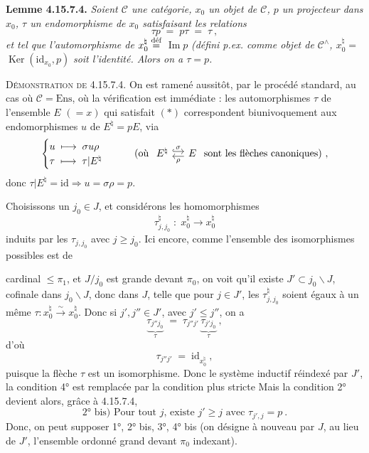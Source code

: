 \documentclass[11pt]{article}
\newcommand{\printedpage}[1]{\marginpar{\footnotesize p.~#1}}
\newcommand{\msp}[1]{\marginpar{\footnotesize [#1]}}
\newcommand{\cC}{\mathcal{C}}
\newcommand{\id}{\mathrm{id}}
\newcommand{\defeq}{\overset{\text{\upshape déf}}{=}}
\newcommand{\Img}{\operatorname{Im}}
\newcommand{\Ker}{\operatorname{Ker}}
\begin{document}
\textbf{Lemme 4.15.7.4.} \textit{Soient $\cC$ une catégorie, $x_0$ un objet de $\cC$, $p$ un projecteur dans $x_0$, $\tau$ un endomorphisme de $x_0$ satisfaisant les relations}
\[
\tau p \;=\; p\tau \;=\; \tau\ , \tag*{$(*)$}
\]
\printedpage{171}
\textit{et tel que l'automorphisme de $x_0^\natural \defeq$} $\Img p$ \textit{(défini p.ex. comme objet de $\cC^\wedge$, $x_0^\natural =$} $\Ker(\id_{x_0},p)$ %
\textit{soit l'identité. Alors on a $\tau = p$.}

\textsc{Démonstration de} 4.15.7.4. On est ramené aussitôt, par le procédé standard, au cas où $\cC = \mathrm{Ens}$, où la vérification est immédiate : les automorphismes $\tau$ de l'ensemble $E$ $(= x)$ qui satisfait $(*)$ correspondent biunivoquement aux endomorphismes $u$ de $E^\natural = pE$, via
\[
\begin{cases}
u \;\longmapsto\; \sigma u \rho \\
\tau \;\longmapsto\; \tau|E^\natural
\end{cases}
\qquad
\text{(où }
\begin{tikzcd}[column sep=small]
E^\natural \arrow[r, hook, shift left, "\sigma"] & E \arrow[l, shift left, "\rho"]
\end{tikzcd}
\text{ sont les flèches canoniques)}\ ,
\]
donc $\tau|E^\natural = \id \Longrightarrow u = \sigma\rho = p$.

Choisissons un $j_0 \in J$, et considérons les homomorphismes
\[
\tau^\natural_{j,j_0} \;:\; x_0^\natural \longrightarrow x_0^\natural
\]
induits par les $\tau_{j,j_0}$ avec $j \geqslant j_0$. Ici encore, comme l'ensemble des isomorphismes possibles est de

\msp{page 446}
cardinal $\leqslant \pi_1$, et $J/j_0$ est grande devant $\pi_0$, on voit qu'il existe $J' \subset j_0\backslash J$, cofinale dans $j_0\backslash J$, donc dans $J$, telle que pour $j \in J'$, les $\tau^\natural_{j,j_0}$ soient égaux à un même $\tau : x_0^\natural \xrightarrow{\sim} x_0^\natural$. Donc si $j', j'' \in J'$, avec $j' \leqslant j''$, on a
\[
\underbrace{\tau_{j''j_0}}_{\tau} \;=\; \tau_{j''j'}\,\underbrace{\tau_{j'j_0}}_{\tau}\ ,
\]
d'où
\[
\tau_{j''j'} \;=\; \id_{x_0^\natural}\ ,
\]
puisque la flèche $\tau$ est un isomorphisme. Donc le système inductif réindexé par $J'$, la condition 4° est remplacée par la condition plus stricte \fbox{4° bis) $\tau^\natural_{j',j} = \id_{x_0^\natural}$.} Mais la condition 2° devient alors, grâce à 4.15.7.4,
\[
\boxed{\text{2° bis) Pour tout } j\text{, existe } j' \geqslant j \text{ avec } \tau_{j',j} = p}\ .
\]
Donc, on peut supposer 1°, 2° bis, 3°, 4° bis (on désigne à nouveau par $J$, au lieu de $J'$, l'ensemble ordonné grand devant $\pi_0$ indexant).
\end{document}
